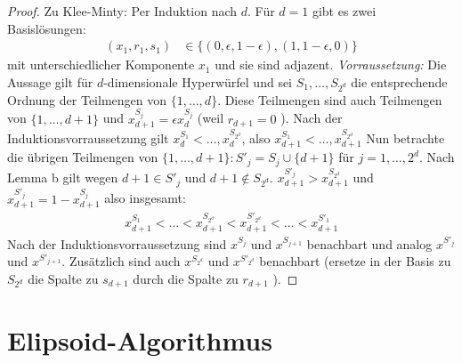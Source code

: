 \begin{proof}
Zu Klee-Minty:
Per Induktion nach $d$. Für $d=1$ gibt es zwei Basislösungen:
\begin{align*}
(x_1,r_1, s_1) &\in \{ (0,\epsilon, 1-\epsilon) , (1,1-\epsilon,0) \}
\end{align*}
mit unterschiedlicher Komponente $x_1$ und sie sind adjazent.
\emph{Vorraussetzung:} Die Aussage gilt für $d$-dimensionale Hyperwürfel und sei $S_1 ,\dotsc, S_{2^d}$ die entsprechende Ordnung der Teilmengen von $\{1,\dotsc, d\}$.
Diese Teilmengen sind auch Teilmengen von $\{1, \dotsc, d+1\}$ und $x^{S_j}_{d+1} = \epsilon x^{S_j}_{d}$ (weil $r_{d+1} = 0$ ).
Nach der Induktionsvorraussetzung gilt $x^{S_1}_d < \dotsc , x^{S_{2^d}}_{d}$, also $x^{S_1}_{d+1} < \dotsc , x^{S_{2^d}}_{d+1}$
Nun betrachte die übrigen Teilmengen von $\{1,\dotsc, d+1\}: S'_j = S_j \cup \{d+1\}$ für $j=1,\dotsc,2^d$.
Nach Lemma b gilt wegen $d+1 \in S'_j$ und $d+1 \notin S_{2^d}$.
$x^{S'_j}_{d+1} > x^{S_{2^d}}_{d+1}$ und $x^{S'_j}_{d+1} = 1 - x^{S_j}_{d+1}$ also insgesamt: 
\begin{align*}
x^{S_1}_{d+1} < \dotsc < x^{S_{2^d}}_{d+1} < x^{S'_{2^d}}_{d+1} < \dotsc < x^{S'_1}_{d+1}
\end{align*}
Nach der Induktionsvorraussetzung sind $x^{S_j}$ und $x^{S_{j+1}}$ benachbart und analog $x^{S'_j}$ und $x^{S'_{j+1}}$.
Zusätzlich sind auch $x^{S_{2^d}}$ und $x^{S'_{2^d}}$ benachbart (ersetze in der Basis zu $S_{2^d}$ die Spalte zu $s_{d+1}$ durch die Spalte zu $r_{d+1}$ ).
\end{proof}

\section{Elipsoid-Algorithmus}

